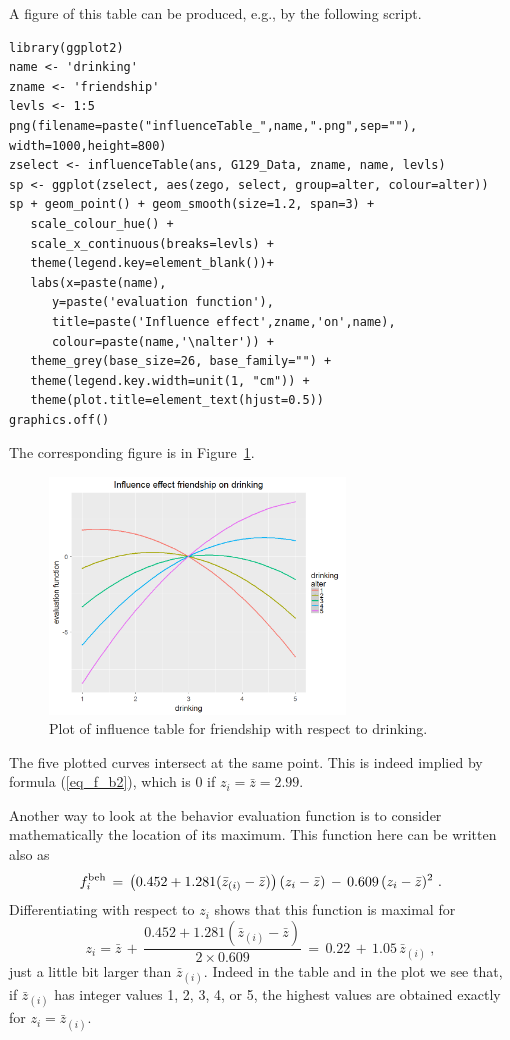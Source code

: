 \documentclass[a4paper,fleqn,11pt]{article}
\newcommand{\+}{\, + \,}
\begin{document}
A figure of this table can be produced, e.g., by the following script.
\begin{verbatim}
library(ggplot2)
name <- 'drinking'
zname <- 'friendship'
levls <- 1:5
png(filename=paste("influenceTable_",name,".png",sep=""), width=1000,height=800)
zselect <- influenceTable(ans, G129_Data, zname, name, levls)
sp <- ggplot(zselect, aes(zego, select, group=alter, colour=alter))
sp + geom_point() + geom_smooth(size=1.2, span=3) +
   scale_colour_hue() +
   scale_x_continuous(breaks=levls) +
   theme(legend.key=element_blank())+
   labs(x=paste(name),
      y=paste('evaluation function'),
      title=paste('Influence effect',zname,'on',name),
      colour=paste(name,'\nalter')) +
   theme_grey(base_size=26, base_family="") +
   theme(legend.key.width=unit(1, "cm")) +
   theme(plot.title=element_text(hjust=0.5))
graphics.off()
\end{verbatim}

The corresponding figure is in Figure~\ref{F_infl_dk}.

\begin{figure}[hb]
  \centering
  \includegraphics[width=0.7\textwidth]{influenceTable_drinking.png}
  \caption{Plot of influence table  for friendship with respect to drinking.}
  \label{F_infl_dk}
\end{figure}

\noindent
The five plotted curves intersect at the same point. This is indeed implied
by  formula (\ref{eq_f_b2}), which is 0 if $z_i = \bar z = 2.99$.


Another way to look at the behavior evaluation function is to consider
mathematically the location of its maximum.
This function here can be written also as
\[
   f^{\rm beh}_i \,=\, \big( 0.452 +
                1.281( \bar z_{(i)} - \bar z) \big) \, (z_i - \bar z)
       \,-\, 0.609 \, (z_i - \bar z)^2   \ .
\]
Differentiating with respect to $z_i$ shows that
this function is maximal for
\[
   z_i = \bar z \,+\, \frac{0.452 +
               1.281( \bar z_{(i)} - \bar z)}{2 \times  0.609 }
    \,=\,  0.22 \,+\, 1.05 \,  \bar z_{(i)}  \ ,
\]
just a little bit larger than $ \bar z_{(i)}$.
Indeed in the table and in the plot we see that, if $ \bar z_{(i)}$
has integer values 1, 2, 3, 4, or 5,
the highest values are obtained exactly
for  $z_i = \bar z_{(i)}$.
\end{document}
